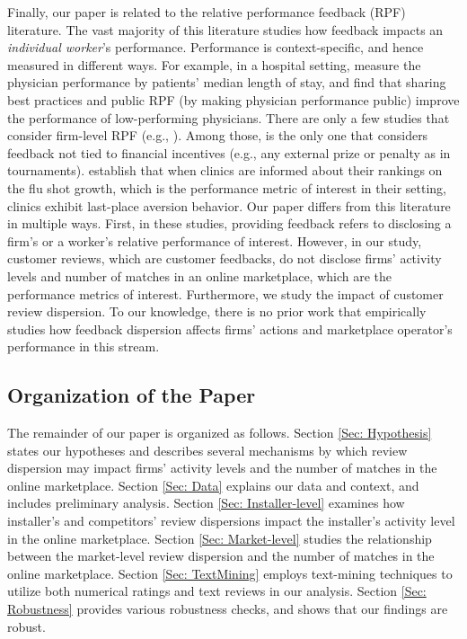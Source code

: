 \documentclass[mnsc,blindrev]{informs3}
\begin{document}
	
	
	
	Finally, our paper is related to the relative performance feedback (RPF) literature. The vast majority of this literature studies how feedback impacts an \emph{individual worker}'s performance. Performance is context-specific, and hence measured in different ways. For example, in a hospital setting, \cite{song2017closing} measure the physician performance by patients' median length of stay, and find that sharing best practices and public RPF (by making physician performance public) improve the performance of low-performing physicians. There are only a few studies that consider firm-level RPF (e.g., \cite{josse2013}). Among those, \cite{staats} is the only one that considers feedback not tied to financial incentives (e.g., any external prize or penalty as in tournaments). \cite{staats} establish that when clinics are informed about their rankings on the flu shot growth, which is the performance metric of interest in their setting, clinics exhibit last-place aversion behavior. Our paper differs from this literature in multiple ways. First, in these studies, providing feedback refers to disclosing a firm's or a worker's relative performance of interest. However, in our study, customer reviews, which are customer feedbacks, do not disclose  firms' activity levels and number of matches in an online marketplace, which are the performance metrics of interest. Furthermore, we study the impact of customer review dispersion. To our knowledge, there is no prior work that empirically studies how feedback dispersion affects firms' actions and marketplace operator's performance in this stream.
	
\subsection{Organization of the Paper}
	
	The remainder of our paper is organized as follows. Section \ref{Sec: Hypothesis} states our hypotheses and describes several mechanisms by which review dispersion may impact firms' activity levels and the number of matches in the online marketplace. Section \ref{Sec: Data} explains our data and context, and includes preliminary analysis. Section \ref{Sec: Installer-level} examines how installer's and competitors' review dispersions impact the installer's activity level in the online marketplace. Section \ref{Sec: Market-level} studies the relationship between the market-level review dispersion and the number of matches in the online marketplace. Section \ref{Sec: TextMining} employs text-mining techniques to utilize both numerical ratings and text reviews in our analysis. Section \ref{Sec: Robustness}  provides various robustness checks, and shows that our findings are robust.
	
\end{document}
